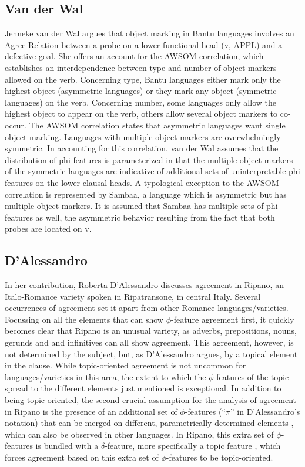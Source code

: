 \documentclass[output=paper
,modfonts
,nonflat]{langsci/langscibook}
\begin{document}
\subsection{Van der Wal}
\label{sec:vdwal}

Jenneke van der Wal argues that object marking in Bantu languages involves an Agree Relation between a probe on a lower functional head (v, APPL) and a defective goal. She offers an account for the AWSOM correlation, which establishes an interdependence between type and number of object markers allowed on the verb. Concerning type, Bantu languages either mark only the highest object (asymmetric languages) or they mark any object (symmetric languages) on the verb. Concerning number, some languages only allow the highest object to appear on the verb, others allow several object markers to co-occur. The AWSOM correlation states that asymmetric languages want single object marking. Languages with multiple object markers are overwhelmingly symmetric. In accounting for this correlation, van der Wal assumes that the distribution of phi-features is parameterized in that the multiple object markers of the symmetric languages are indicative of additional sets of uninterpretable phi features on the lower clausal heads. A typological exception to the AWSOM correlation is represented by Sambaa, a language which is asymmetric but has multiple object markers. It is assumed that Sambaa has multiple sets of phi features as well, the asymmetric behavior resulting from the fact that both probes are located on v. 

\subsection{D'Alessandro}
\label{sec:dalessandro}

In her contribution, Roberta D'Alessandro discusses agreement in Ripano, an Italo-Romance variety spoken in Ripatransone, in central Italy. Several occurrences of agreement set it apart from other Romance languages/varieties. Focussing on all the elements that can show $\phi$-feature agreement first, it quickly becomes clear that Ripano is an unusual variety, as adverbs, prepositions, nouns, gerunds and and infinitives can all show agreement. This agreement, however, is not determined by the subject, but, as D'Alessandro argues, by a topical element in the clause. While topic-oriented agreement is not uncommon for languages/varieties in this area, the extent to which the $\phi$-features of the topic spread to the different elements just mentioned is exceptional. In addition to being topic-oriented, the second crucial assumption for the analysis of agreement in Ripano is the presence of an additional set of $\phi$-features (``$\pi$'' in D'Alessandro's notation) that can be merged on different, parametrically determined elements \citep{DAlessandro2017}, which can also be observed in other languages. In Ripano, this extra set of $\phi$-features is bundled with a $\delta$-feature, more specifically a topic feature \citep{Miyagawa2017}, which forces agreement based on this extra set of $\phi$-features to be topic-oriented.
\end{document}
